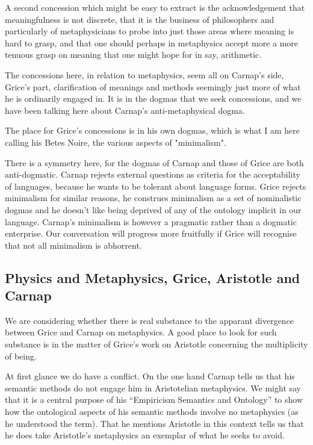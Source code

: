 \documentclass[10pt,titlepage]{book}
\begin{document}
 A second concession which might be easy to extract is the acknowledgement that meaningfulness is not discrete, that it is the business of philosophers and particularly of metaphysicians to probe into just those areas where meaning is hard to grasp, and that one should perhaps in metaphysics accept more a more tenuous grasp on meaning that one might hope for in say, arithmetic.

The concessions here, in relation to metaphysics, seem all on Carnap's side, Grice's part, clarification of meanings and methods seemingly just more of what he is ordinarily engaged in.   It is in the dogmas that we seek concessions, and we have been talking here about Carnap's anti-metaphysical dogma.

The place for Grice's concessions is in his own dogmas, which is what I am here calling his Betes Noire, the various aspects of "minimalism".

There is a symmetry here, for the dogmas of Carnap and those of Grice are both anti-dogmatic.  Carnap rejects external questions as criteria for the acceptability of languages, because he wants to be tolerant about language forms.  Grice rejects minimalism for similar reasons, he construes minimalism as a set of nominalistic dogmas and he doesn't like being deprived of any of the ontology implicit in our language.  Carnap's minimalism is however a pragmatic rather than a dogmatic enterprise.  Our conversation will progress more fruitfully if Grice will recognise that not all minimalism is abhorrent.

\subsection{Physics and Metaphysics, Grice, Aristotle and Carnap}

We are considering whether there is real substance to the apparant divergence between Grice and Carnap on metaphysics.
A good place to look for such substance is in the matter of Grice's work on Aristotle concerning the multiplicity of being.

At first glance we do have a conflict.
On the one hand Carnap tells us that his semantic methods do not engage him in Aristotelian metaphysics.
We might say that it is a central purpose of his ``Empiricism Semantics and Ontology'' to show how the ontological aspects of his semantic methods involve no metaphysics (as he understood the term).
That he mentions Aristotle in this context tells us that he does take Aristotle's metaphysics an exemplar of what he seeks to avoid.
\end{document}
